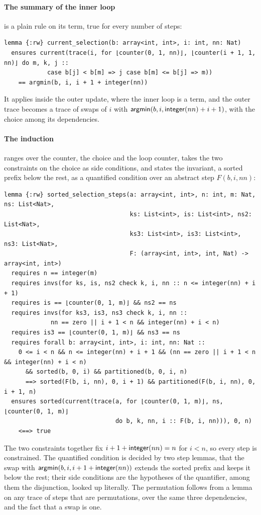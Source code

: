 \paragraph{The summary of the inner loop} is a plain rule on its term, true for every number of steps:
\begin{lstlisting}
lemma {:rw} current_selection(b: array<int, int>, i: int, nn: Nat)
  ensures current(trace(i, for ⌊counter(0, 1, nn)⌋, ⌊counter(i + 1, 1, nn)⌋ do m, k, j ::
            case b[j] < b[m] => j case b[m] <= b[j] => m))
    == argmin(b, i, i + 1 + integer(nn))
\end{lstlisting}
It applies inside the outer update, where the inner loop is a term, and the outer trace becomes a trace of swaps of $i$
with $\mathsf{argmin}(b, i, \mathsf{integer}(nn) + i + 1)$, with the choice among its dependencies.

\paragraph{The induction} ranges over the counter, the choice and the loop counter, takes the two constraints on the
choice as side conditions, and states the invariant, a sorted prefix below the rest, as a quantified condition over
an abstract step $F(b, i, nn)$:
\begin{lstlisting}
lemma {:rw} sorted_selection_steps(a: array<int, int>, n: int, m: Nat, ns: List<Nat>,
                                   ks: List<int>, is: List<int>, ns2: List<Nat>,
                                   ks3: List<int>, is3: List<int>, ns3: List<Nat>,
                                   F: (array<int, int>, int, Nat) -> array<int, int>)
  requires n == integer(m)
  requires invs(for ks, is, ns2 check k, i, nn :: n <= integer(nn) + i + 1)
  requires is == ⌊counter(0, 1, m)⌋ && ns2 == ns
  requires invs(for ks3, is3, ns3 check k, i, nn ::
             nn == zero || i + 1 < n && integer(nn) + i < n)
  requires is3 == ⌊counter(0, 1, m)⌋ && ns3 == ns
  requires forall b: array<int, int>, i: int, nn: Nat ::
    0 <= i < n && n <= integer(nn) + i + 1 && (nn == zero || i + 1 < n && integer(nn) + i < n)
      && sorted(b, 0, i) && partitioned(b, 0, i, n)
      ==> sorted(F(b, i, nn), 0, i + 1) && partitioned(F(b, i, nn), 0, i + 1, n)
  ensures sorted(current(trace(a, for ⌊counter(0, 1, m)⌋, ns, ⌊counter(0, 1, m)⌋
                               do b, k, nn, i :: F(b, i, nn))), 0, n)
    <==> true
\end{lstlisting}
The two constraints together fix $i + 1 + \mathsf{integer}(nn) = n$ for $i < n$, so every step is constrained. The quantified
condition is decided by two step lemmas, that the swap with $\mathsf{argmin}(b, i, i + 1 + \mathsf{integer}(nn))$ extends the sorted
prefix and keeps it below the rest; their side conditions are the hypotheses of the quantifier, among them the
disjunction, looked up literally. The permutation follows from a lemma on any trace of steps that are permutations,
over the same three dependencies, and the fact that a swap is one.

